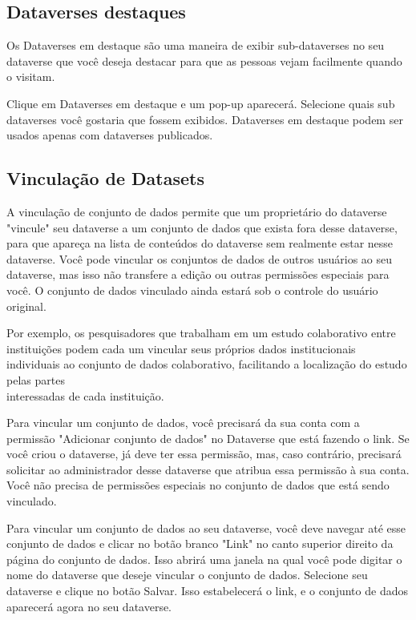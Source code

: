 \documentclass[12pt,hidelinks]{article}
\begin{document}
    \subsection{Dataverses destaques}
    
\qquad Os Dataverses em destaque são uma maneira de exibir sub-dataverses no seu dataverse que você deseja destacar para que as pessoas vejam facilmente quando o visitam.

Clique em Dataverses em destaque e um pop-up aparecerá. Selecione quais sub dataverses você gostaria que fossem exibidos. Dataverses em destaque podem ser usados apenas com dataverses publicados.
    
    \subsection{Vinculação de Datasets}
    
\qquad A vinculação de conjunto de dados permite que um proprietário do dataverse "vincule" seu dataverse a um conjunto de dados que exista fora desse dataverse, para que apareça na lista de conteúdos do dataverse sem realmente estar nesse dataverse. Você pode vincular os conjuntos de dados de outros usuários ao seu dataverse, mas isso não transfere a edição ou outras permissões especiais para você. O conjunto de dados vinculado ainda estará sob o controle do usuário original.

Por exemplo, os pesquisadores que trabalham em um estudo colaborativo entre instituições podem cada um vincular seus próprios dados institucionais individuais ao conjunto de dados colaborativo, facilitando a localização do estudo pelas partes \\interessadas de cada instituição.

Para vincular um conjunto de dados, você precisará da sua conta com a permissão "Adicionar conjunto de dados" no Dataverse que está fazendo o link. Se você criou o dataverse, já deve ter essa permissão, mas, caso contrário, precisará solicitar ao administrador desse dataverse que atribua essa permissão à sua conta. Você não precisa de permissões especiais no conjunto de dados que está sendo vinculado.

Para vincular um conjunto de dados ao seu dataverse, você deve navegar até esse conjunto de dados e clicar no botão branco "Link" no canto superior direito da página do conjunto de dados. Isso abrirá uma janela na qual você pode digitar o nome do dataverse que deseje vincular o conjunto de dados. Selecione seu dataverse e clique no botão Salvar. Isso estabelecerá o link, e o conjunto de dados aparecerá agora no seu dataverse.
\end{document}
